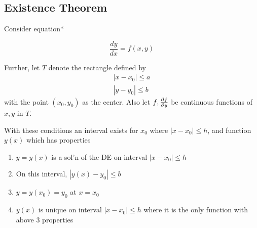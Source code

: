 \subsection{Existence Theorem}

Consider equation*

\begin{equation*}
    \frac{dy}{dx}=f(x,y)
\end{equation*}

Further, let $T$ denote the rectangle defined by
\begin{eqnarray}
    |x-x_0|\leq a\\
    |y-y_0|\leq b
\end{eqnarray}
with the point $(x_0,y_0)$ as the center.
Also let $f,\frac{\partial f}{\partial y}$ be continuous functions of $x,y$ in $T$.

With these conditions an interval exists for $x_0$ where $|x-x_0|\leq h$, and function $y(x)$
which has properties
\begin{enumerate}
    \item $y=y(x)$ is a sol'n of the DE on interval $|x-x_0|\leq h$
    \item On this interval, $|y(x)-y_0|\leq b$
    \item $y=y(x_0)=y_0$ at $x=x_0$
    \item $y(x)$ is unique on interval $|x-x_0|\leq h$ where it is the only function with above 3 properties
\end{enumerate}
